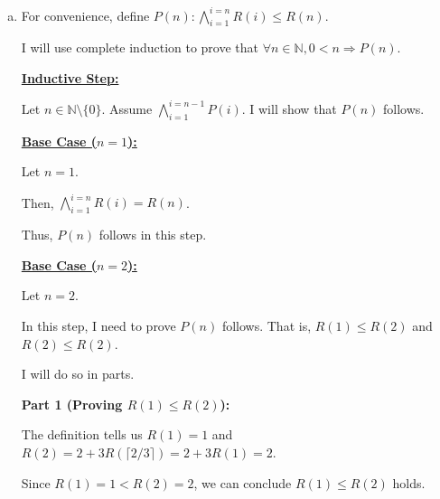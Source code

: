 \documentclass[12pt]{article}
\begin{document}
\begin{enumerate}[a.]

    \item

    \bigskip

    For convenience, define $P(n): \bigwedge\limits_{i=1}^{i=n} R(i) \leq R(n)$.

    \bigskip

    I will use complete induction to prove that $\forall n \in \mathbb{N},
    0 < n \Rightarrow P(n)$.

    \bigskip

    \underline{\textbf{Inductive Step:}}

    \bigskip

    Let $n \in \mathbb{N} \setminus \{0\}$. Assume $\bigwedge\limits_{i=1}^{i=n-1} P(i)$.
    I will show that $P(n)$ follows.

    \bigskip

    \underline{\textbf{Base Case ($n = 1$):}}

    \bigskip

    Let $n = 1$.

    \bigskip

    Then, $\bigwedge\limits_{i=1}^{i=n} R(i) = R(n)$.

    \bigskip

    Thus, $P(n)$ follows in this step.

    \bigskip

    \underline{\textbf{Base Case ($n = 2$):}}

    \bigskip

    Let $n = 2$.

    \bigskip

    In this step, I need to prove $P(n)$ follows. That is, $R(1) \leq R(2)$ and
    $R(2) \leq R(2)$.

    \bigskip

    I will do so in parts.

    \bigskip

    \textbf{Part 1 (Proving $R(1) \leq R(2)$):}

    \bigskip

    The definition tells us $R(1) = 1$ and $R(2) = 2 +
    3R(\lceil 2/3 \rceil) = 2 + 3R(1) = 2$.

    \bigskip

    Since $R(1) = 1 < R(2) = 2$, we can conclude $R(1) \leq R(2)$ holds.


\end{enumerate}
\end{document}
